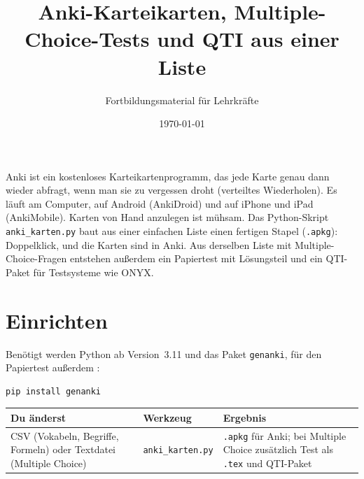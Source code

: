 



\title{Anki-Karteikarten, Multiple-Choice-Tests und QTI aus einer Liste}
\author{Fortbildungsmaterial für Lehrkräfte}
\date{\today}
\pagestyle{plain}
\setlength{\parskip}{1.5em} %
\setlength{\emergencystretch}{4em} %




\maketitle

Anki ist ein kostenloses Karteikartenprogramm, das jede Karte genau dann wieder abfragt, wenn man sie zu vergessen droht (verteiltes Wiederholen). Es läuft am Computer, auf Android (AnkiDroid) und auf iPhone und iPad (AnkiMobile). Karten von Hand anzulegen ist mühsam. Das Python-Skript \texttt{anki\_karten.py} baut aus einer einfachen Liste einen fertigen Stapel (\texttt{.apkg}): Doppelklick, und die Karten sind in Anki. Aus derselben Liste mit Multiple-Choice-Fragen entstehen außerdem ein Papiertest mit Lösungsteil und ein QTI-Paket für Testsysteme wie ONYX.

\tableofcontents



\section{Einrichten}

Benötigt werden Python ab Version~3.11 und das Paket \texttt{genanki}, für den Papiertest außerdem :

\begin{lstlisting}[style=latex]
pip install genanki
\end{lstlisting}

\begin{center}
\begin{tabular}{@{}>{\raggedright\arraybackslash}p{4.6cm}>{\raggedright\arraybackslash}p{3.4cm}>{\raggedright\arraybackslash}p{6.8cm}@{}}
	\toprule
	\textbf{Du änderst} & \textbf{Werkzeug} & \textbf{Ergebnis} \\
	\midrule
	CSV (Vokabeln, Begriffe, Formeln) oder Textdatei (Multiple Choice) & \texttt{anki\_karten.py} & \texttt{.apkg} für Anki; bei Multiple Choice zusätzlich Test als \texttt{.tex} und QTI-Paket \\
	\bottomrule
\end{tabular}
\end{center}




